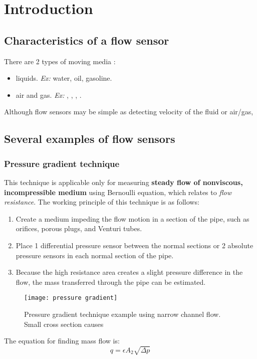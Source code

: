 \chapter{Introduction}
\section{Characteristics of a flow sensor}

There are 2 types of moving media \cite{handbook}:
\begin{itemize}
	\item liquids. \textit{Ex:} water, oil, gasoline.
	\item air and gas. \textit{Ex:} , , , .	
\end{itemize}

Although flow sensors may be simple as detecting velocity of the fluid or air/gas, 
\section{Several examples of flow sensors}
\subsection{Pressure gradient technique}
This technique is applicable only for measuring \textbf{steady flow of nonviscous, incompressible medium} using Bernoulli equation, which relates to \textit{flow resistance}. The working principle of this technique is as follows:
\begin{enumerate}
	\item Create a medium impeding the flow motion in a section of the pipe, such as orifices, porous plugs, and Venturi tubes.
	\item Place 1 differential pressure sensor between the normal sections or 2 absolute pressure sensors in each normal section of the pipe.
	\item Because the high resistance area creates a slight pressure difference in the flow, the mass transferred through the pipe can be estimated.
\end{enumerate}
\begin{figure}[ht]
	\centering
	\texttt{[image: pressure gradient]}
	\caption{Pressure gradient technique example using narrow channel flow. Small cross section causes }
	\label{fig:01}
\end{figure}

The equation for finding mass flow is:
\begin{equation}
q = \epsilon A_2 \sqrt{\Delta p}
\end{equation}

